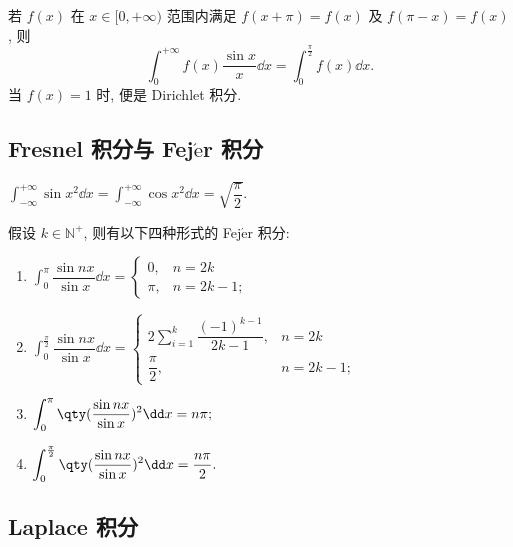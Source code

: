 \begin{theorem}
    若 $f(x)$ 在 $x\in[0,+\infty)$ 范围内满足 $f(x+\pi)=f(x)$ 及 $f(\pi-x)=f(x)$, 则
    $$\int_{0}^{+\infty}f(x)\dfrac{\sin x}{x}\dd x=\int_{0}^{\frac{\pi}{2}}f(x)\dd x.$$
    当 $f(x)=1$ 时, 便是 Dirichlet 积分.
\end{theorem}

\subsection{Fresnel 积分与 Fej\texorpdfstring{$\acute{\text{e}}$}.r 积分}

\begin{theorem}
    $\displaystyle\int_{-\infty}^{+\infty}\sin x^2\dd x=\int_{-\infty}^{+\infty}\cos x^2\dd x=\sqrt{\dfrac{\pi}{2}}.$
\end{theorem}

\begin{theorem}
    假设 $k\in\mathbb{N}^+$, 则有以下四种形式的 Fej$\acute{\text{e}}$r 积分:
    \begin{enumerate}[label=(\arabic{*})]
        \item $\displaystyle \int_{0}^{\pi}\dfrac{\sin nx}{\sin x}\dd x=\begin{cases}
                      0,   & n=2k    \\
                      \pi, & n=2k-1;
                  \end{cases}$
        \item $\displaystyle\int_{0}^{\frac{\pi}{2}}\dfrac{\sin nx}{\sin x}\dd x=\begin{cases}
                      2\displaystyle\sum_{i=1}^{k}\dfrac{(-1)^{k-1}}{2k-1}, & n=2k    \\[6pt]
                      \dfrac{\pi}{2},                                       & n=2k-1;
                  \end{cases}$
        \item $\displaystyle \int_{0}^{\pi}\qty(\dfrac{\sin nx}{\sin x})^2\dd x=n\pi;$
        \item $\displaystyle\int_{0}^{\frac{\pi}{2}}\qty(\dfrac{\sin nx}{\sin x})^2\dd x=\dfrac{n\pi  }{2}.$
    \end{enumerate}
\end{theorem}

\subsection{Laplace 积分}

